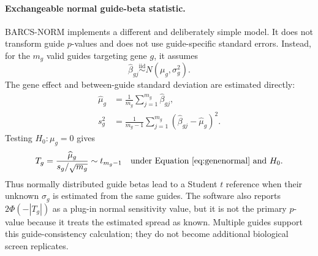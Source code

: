 \paragraph{Exchangeable normal guide-beta statistic.}
BARCS-NORM implements a different and deliberately simple model.  It does not
transform guide $p$-values and does not use guide-specific standard errors.
Instead, for the $m_g$ valid guides targeting gene $g$, it assumes
\begin{equation}
  \widehat{\beta}_{gj}
  \mathrel{\overset{\mathrm{iid}}{\sim}}
  N(\mu_g,\sigma_g^2).
  \label{eq:genenormal}
\end{equation}
The gene effect and between-guide standard deviation are estimated directly:
\begin{align}
  \widehat{\mu}_g
  &=
  \frac{1}{m_g}\sum_{j=1}^{m_g}\widehat{\beta}_{gj},\\
  s_g^2
  &=
  \frac{1}{m_g-1}
  \sum_{j=1}^{m_g}
  (\widehat{\beta}_{gj}-\widehat{\mu}_g)^2.
\end{align}
Testing $H_0:\mu_g=0$ gives
\begin{equation}
  T_g
  =
  \frac{\widehat{\mu}_g}{s_g/\sqrt{m_g}}
  \sim t_{m_g-1}
  \quad\text{under Equation~\eqref{eq:genenormal} and }H_0.
  \label{eq:genenormalt}
\end{equation}
Thus normally distributed guide betas lead to a Student $t$ reference when
their unknown $\sigma_g$ is estimated from the same guides.  The software also
reports $2\Phi(-|T_g|)$ as a plug-in normal sensitivity value, but it is not
the primary $p$-value because it treats the estimated spread as known.
Multiple guides support this guide-consistency calculation; they do not become
additional biological screen replicates.

